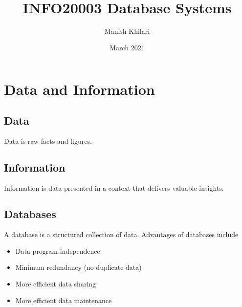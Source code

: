 \documentclass[12pt, a4paper]{article}
\title{INFO20003 Database Systems}
\author{Manish Khilari}
\date{March 2021}
\begin{document}
    
    \maketitle

    \section{Data and Information}
    \subsection{Data}
    Data is raw facts and figures. 

    \subsection{Information}
    Information is data presented in a context that delivers valuable insights. 

    \subsection{Databases}
    A database is a structured collection of data.  
    Advantages of databases include 
    \begin{itemize}
        \item Data program independence 
        \item Minimum redundancy (no duplicate data) 
        \item More efficient data sharing 
        \item More efficient data maintenance 
    \end{itemize}
\end{document}
